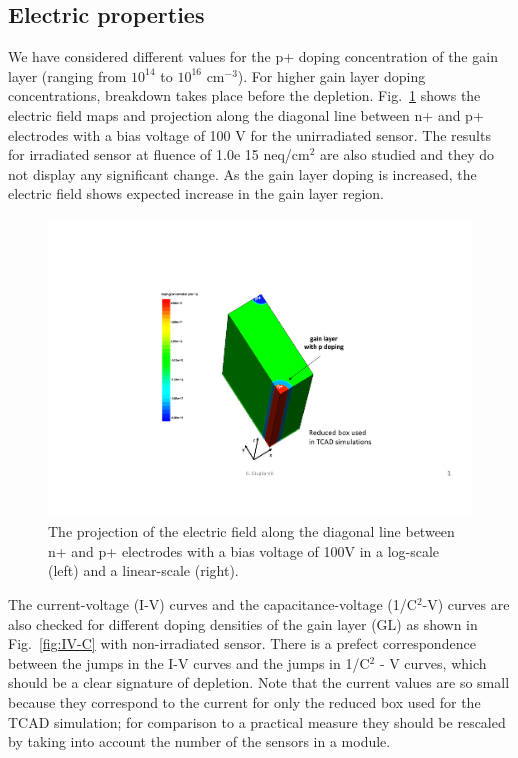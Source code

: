 \documentclass[aps,pt14,superscriptaddress,showpacs,floatfix,nofootinbib]{revtex4}
\begin{document}
\subsection{Electric properties}    
We have considered different values for the p+ doping
concentration of the gain layer (ranging from $10^{14}$ to $10^{16}$ cm$^{-3}$).
For higher gain layer doping concentrations, breakdown takes place before the depletion. 
Fig.~\ref{fig:efield} shows the electric field maps and projection along the diagonal line 
between n+ and p+ electrodes with a bias voltage of 100 V for the unirradiated sensor. 
The results for irradiated sensor at fluence of 1.0e 15 neq/cm$^2$ are also studied 
and they do not display any significant change. 
As the gain layer doping is increased, the electric field shows expected increase in the gain layer region.
  
\begin{figure}[hbtp]
\begin{center}
\includegraphics[page=2,width=0.5\textheight,keepaspectratio]{figures/IBL-3DwithGainLayer_20190610_toWeiming.pdf}
\caption{The projection of the electric field along the diagonal line between n+ and p+ electrodes with a bias voltage of 100V
in a log-scale (left) and a linear-scale (right).~\label{fig:efield}} 
\end{center}
\end{figure}

The current-voltage (I-V) curves and the capacitance-voltage (1/C$^2$-V) curves are also checked for 
different doping densities of the gain layer (GL) as shown in Fig.~\ref{fig:IV-C} with non-irradiated sensor.
There is a prefect correspondence between the jumps in the I-V curves and the jumps in 1/C$^2$ - V curves, which 
should be a clear signature of depletion.  
Note that the current values are so small because they correspond to the
current for only the reduced box used for the TCAD simulation; for
comparison to a practical measure they should be rescaled by taking into
account the number of the sensors in a module.
\end{document}
